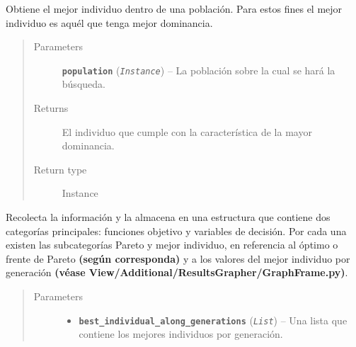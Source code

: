 \documentclass[letterpaper,10pt,english]{sphinxmanual}
\begin{document}
\begin{fulllineitems}
\begin{fulllineitems}
\begin{quote}
\begin{description}
\end{description}\end{quote}

\end{fulllineitems}


\begin{fulllineitems}
\label{Model/Community/Community:Model.Community.Community.Community.get_best_individual}
Obtiene el mejor individuo dentro de una población. Para estos fines el mejor individuo es aquél que
tenga mejor dominancia.
\begin{quote}\begin{description}
\item[{Parameters}] \leavevmode
\textbf{\texttt{population}} (\emph{\texttt{Instance}}) -- La población sobre la cual se hará la búsqueda.

\item[{Returns}] \leavevmode
El individuo que cumple con la característica de la mayor dominancia.

\item[{Return type}] \leavevmode
Instance

\end{description}\end{quote}

\end{fulllineitems}


\begin{fulllineitems}
\label{Model/Community/Community:Model.Community.Community.Community.get_results}
Recolecta la información y la almacena en una estructura que contiene dos categorías principales: 
funciones objetivo y variables de decisión. Por cada una existen las subcategorías Pareto y mejor 
individuo, en referencia al óptimo o frente de Pareto \textbf{(según corresponda)} y a los valores del mejor 
individuo por generación \textbf{(véase View/Additional/ResultsGrapher/GraphFrame.py)}.
\begin{quote}\begin{description}
\item[{Parameters}] \leavevmode\begin{itemize}
\item {} 
\textbf{\texttt{best\_individual\_along\_generations}} (\emph{\texttt{List}}) -- Una lista que contiene los mejores individuos por generación.


\end{itemize}
\end{description}
\end{quote}
\end{fulllineitems}
\end{fulllineitems}
\end{document}
